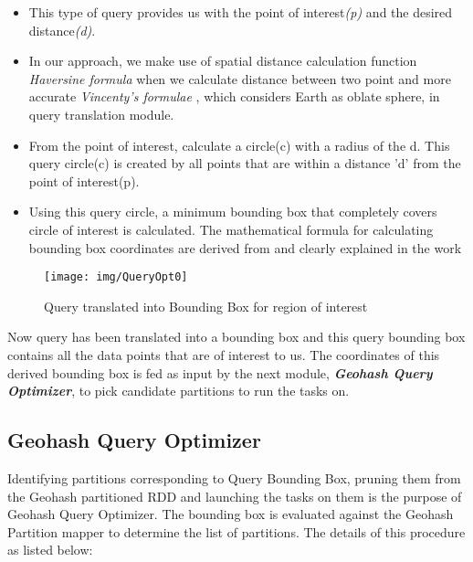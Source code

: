 \documentclass[article,type=msc,colorback,12pt,accentcolor=tud1d]{tudthesis}
\begin{document}
			\begin{itemize}
				\item This type of query provides us with the point of interest\textit{(p)} and the desired distance\textit{(d)}.
				\item In our approach, we make use of spatial distance calculation function \textit{Haversine formula} \cite{wiki:Haversine_formula_1, wiki:Haversine_formula} when we calculate distance between two point and more accurate  \textit{Vincenty's formulae} \cite{wiki:Vincenty's_formulae_1, wiki:Vincenty's_formulae}, which considers Earth as oblate sphere, in query translation module.
				\item From the point of interest, calculate a circle(c) with a radius of the d. This query circle(c) is created by all points that are within a distance 'd'  from the point of interest(p). 
				\item Using this query circle, a minimum bounding box that completely covers circle of interest  is calculated. The mathematical formula for calculating bounding box coordinates are derived from \cite{HandbookofMathematics} and clearly explained in the work \cite{matuschek_2010}
			
			\end{itemize}		
				\clearpage	
				\begin{figure}[h]
				\centering
				\texttt{[image: img/QueryOpt0]}
				\caption{Query translated into Bounding Box for region of interest}
				\label{fig:QueryOpt0}
				\end{figure}
					
			 
			Now query has been translated into a bounding box and this query bounding box contains all the data points that are of interest to us. The coordinates of this derived bounding box is fed as input by the next module, \textbf{\textit{Geohash Query Optimizer}}, to pick candidate partitions to run the tasks on.
			
		\subsection{Geohash Query Optimizer}
		
			\par Identifying partitions corresponding to Query Bounding Box, pruning them from the Geohash partitioned RDD and launching the tasks on them is the purpose of Geohash Query Optimizer. The bounding box is evaluated against the Geohash Partition mapper to determine the list of partitions. The details of this procedure as listed below:
			
\end{document}
